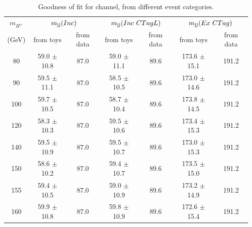 \begin{table}
\caption{Goodness of fit for \ljets channel, from different event categories.}
\label{tab:gofLep}
\centering
\begin{adjustbox}{max width=\textwidth}
\begin{tabular}{ ccccccc}
\hline
\hline
\multicolumn{1}{c}{{\bf{$m_{H^\pm}$}}} & \multicolumn{2}{c}{$m_\text{jj}(Inc)$} & \multicolumn{2}{c}{$m_\text{jj}(Inc ~CTagL)$} & \multicolumn{2}{c}{$m_\text{jj}(Ex ~CTag)$} \\

(GeV) & from toys & from data & from toys & from data & from toys & from data  \\
 \hline
\hline
80  & 59.0 $\pm$ 10.8 & 87.0 & 59.0 $\pm$ 11.1 & 89.6 & 173.6 $\pm$ 15.1 & 191.2\\
  
90  & 59.5 $\pm$ 11.1 & 87.0 & 58.5 $\pm$ 10.5 & 89.6 & 173.0 $\pm$ 14.6 & 191.2\\
  
100  & 59.7 $\pm$ 10.5 & 87.0 & 58.7 $\pm$ 10.4 & 89.6 & 173.8 $\pm$ 14.5 & 191.2\\
  
120  & 58.3 $\pm$ 10.3 & 87.0 & 59.5 $\pm$ 10.6 & 89.6 & 173.4 $\pm$ 15.3 & 191.2\\
  
140  & 59.5 $\pm$ 10.9 & 87.0 & 59.5 $\pm$ 10.7 & 89.6 & 173.0 $\pm$ 15.3 & 191.2\\
  
150  & 58.6 $\pm$ 10.2 & 87.0 & 59.4 $\pm$ 10.7 & 89.6 & 173.5 $\pm$ 15.0 & 191.2\\
  
155  & 59.4 $\pm$ 10.5 & 87.0 & 59.0 $\pm$ 10.9 & 89.6 & 173.2 $\pm$ 14.9 & 191.2\\
  
160  & 59.9 $\pm$ 10.8 & 87.0 & 59.8 $\pm$ 10.9 & 89.6 & 172.6 $\pm$ 15.4 & 191.2\\
\hline
\end{tabular}
\end{adjustbox}
\end{table}
